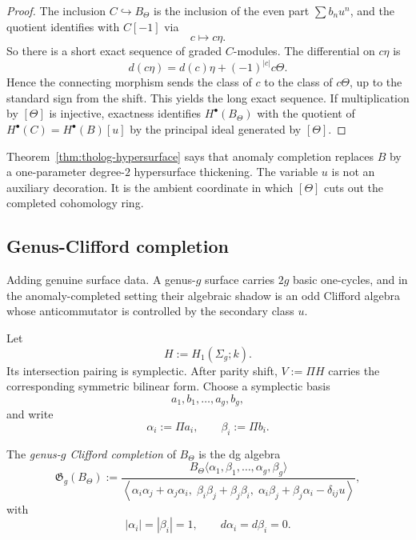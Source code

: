 \begin{proof}
The inclusion \(C\hookrightarrow B_{\Theta}\) is the inclusion of the even part \(\sum b_{n}u^{n}\), and the quotient identifies with \(C[-1]\) via
\[
c\longmapsto c\eta.
\]
So there is a short exact sequence of graded \(C\)-modules.
The differential on \(c\eta\) is
\[
d(c\eta)=d(c)\eta+(-1)^{|c|}c\Theta.
\]
Hence the connecting morphism sends the class of \(c\) to the class of \(c\Theta\), up to the standard sign from the shift.
This yields the long exact sequence.
If multiplication by \([\Theta]\) is injective, exactness identifies \(H^{\bullet}(B_{\Theta})\) with the quotient of \(H^{\bullet}(C)=H^{\bullet}(B)[u]\) by the principal ideal generated by \([\Theta]\).
\end{proof}

\begin{remark}
Theorem~\ref{thm:tholog-hypersurface} says that anomaly completion replaces \(B\) by a one-parameter degree-\(2\) hypersurface thickening.
The variable \(u\) is not an auxiliary decoration.
It is the ambient coordinate in which \([\Theta]\) cuts out the completed cohomology ring.
\end{remark}

\subsection{Genus-Clifford completion}

Adding genuine surface data.
A genus-\(g\) surface carries \(2g\) basic one-cycles, and in the anomaly-completed setting their algebraic shadow is an odd Clifford algebra whose anticommutator is controlled by the secondary class \(u\).

Let
\[
H:=H_{1}(\Sigma_{g};k).
\]
Its intersection pairing is symplectic.
After parity shift, \(V:=\Pi H\) carries the corresponding symmetric bilinear form.
Choose a symplectic basis
\[
a_{1},b_{1},\dots,a_{g},b_{g},
\]
and write
\[
\alpha_{i}:=\Pi a_{i},\qquad \beta_{i}:=\Pi b_{i}.
\]

\begin{definition}
The \emph{genus-\(g\) Clifford completion} of \(B_{\Theta}\) is the dg algebra
\[
\mathfrak{G}_{g}(B_{\Theta})
:=
\frac{
B_{\Theta}\langle \alpha_{1},\beta_{1},\dots,\alpha_{g},\beta_{g}\rangle
}{
\left\langle
\alpha_{i}\alpha_{j}+\alpha_{j}\alpha_{i},\;
\beta_{i}\beta_{j}+\beta_{j}\beta_{i},\;
\alpha_{i}\beta_{j}+\beta_{j}\alpha_{i}-\delta_{ij}u
\right\rangle
},
\]
with
\[
|\alpha_{i}|=|\beta_{i}|=1,\qquad d\alpha_{i}=d\beta_{i}=0.
\]
\end{definition}

